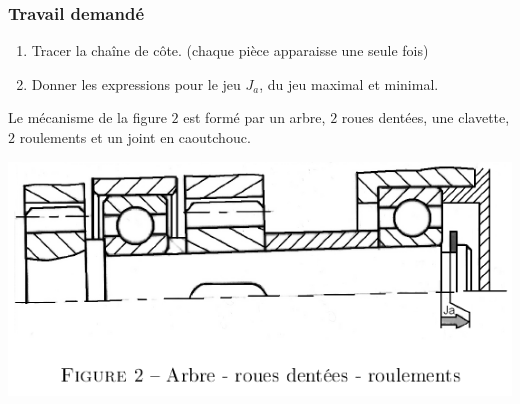 \subsubsection{Travail demandé}
\begin{enumerate}
\item Tracer la chaîne de côte. (chaque pièce apparaisse une seule fois)
\item Donner les expressions pour le jeu $J_a$, du jeu maximal et minimal.
\end{enumerate}

\newpage


Le mécanisme de la figure $2$ est formé par un arbre, $2$ roues dentées, une
clavette, $2$ roulements et un joint en caoutchouc.

\begin{center}
\includegraphics[scale=0.5]{png/arbre.png}
\end{center}

